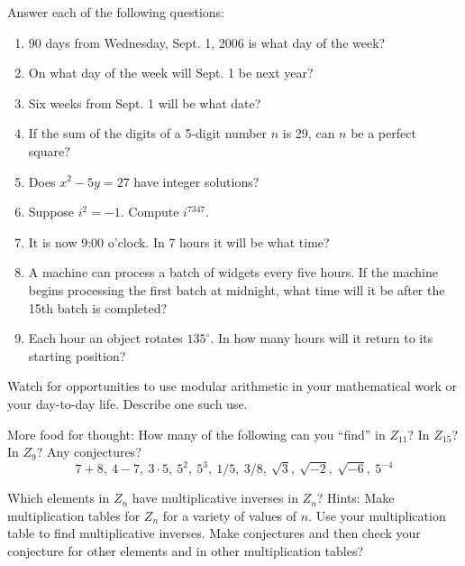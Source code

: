 \documentclass[space,nooutcomes]{ximera}
\begin{document}
\begin{problem}
Answer each of the following questions: 
\begin{enumerate}
\item 90 days from Wednesday, Sept. 1, 2006 is what day of the week?
\item On what day of the week will Sept. 1 be next year?
\item Six weeks from Sept. 1 will be what date?
\item If the sum of the digits of a 5-digit number $n$ is 29, can $n$ be a perfect square?
\item Does $x^2 - 5y = 27$ have integer solutions?
\item Suppose $i^2 = -1$.  Compute $i^{7347}$.
\item It is now 9:00 o'clock.  In 7 hours it will be what time?
\item A machine can process a batch of widgets every five hours.  If the machine begins processing the first batch at midnight, what time will it be after the 15th batch is completed?
\item Each hour an object rotates $135^\circ$.  In how many hours will it return to its starting position?  
\end{enumerate}
\begin{freeResponse}
\end{freeResponse}
\end{problem}

\begin{problem}
Watch for opportunities to use modular arithmetic in your mathematical work or your day-to-day life.  Describe one such use.
\begin{freeResponse}
\end{freeResponse}
\end{problem}

\begin{problem}
More food for thought:  How many of the following can you ``find'' in $Z_{11}$? In $Z_{15}$? In $Z_9$?  Any conjectures? 
\[
7 + 8,\ 4 - 7,\ 3\cdot 5,\ 5^2,\ 5^3,\ 1/5,\ 3/8,\ \sqrt{3},\ \sqrt{-2},\ \sqrt{-6},\ 5^{-4} 
\]
\begin{freeResponse}
\end{freeResponse}
\end{problem}

\begin{problem}
Which elements in $Z_n$ have multiplicative inverses in $Z_n$?  
Hints:  Make multiplication tables for $Z_n$ for a variety of values of $n$.   Use your multiplication table to find multiplicative inverses.  Make conjectures and then check your conjecture for other elements and in other multiplication tables? 
\begin{freeResponse}
\end{freeResponse}
\end{problem}
\end{document}
